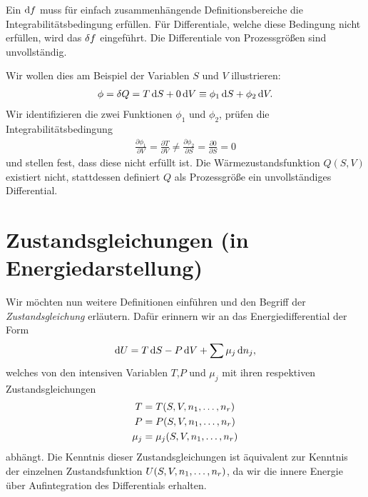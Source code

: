\begin{formal}
    Ein  $\mathop{}\!\mathrm{d} f$ muss für einfach zusammenhängende Definitionsbereiche die Integrabilitätsbedingung erfüllen. Für Differentiale, welche diese Bedingung nicht erfüllen, wird das  $\mathop{}\!\delta f$ eingeführt. Die Differentiale von Prozessgrößen sind unvollständig. 
\end{formal}

Wir wollen dies am Beispiel der Variablen $S$ und $V$ illustrieren:
\begin{align*}
    \phi = \mathop{}\!\delta Q = T\mathop{}\!\mathrm{d} S+0 \mathop{}\!\mathrm{d} V\equiv \phi_1\mathop{}\!\mathrm{d} S+\phi_2 \mathop{}\!\mathrm{d} V.
\end{align*}
Wir identifizieren die zwei Funktionen $\phi_1$ und $\phi_2$, prüfen die Integrabilitätsbedingung
\begin{align*}
    \frac{\partial \phi_1}{\partial V} = \frac{\partial T}{\partial V}\neq \frac{\partial \phi_2}{\partial S}=\frac{\partial0}{\partial S}=0
\end{align*}
und stellen fest, dass diese nicht erfüllt ist. Die Wärmezustandsfunktion $Q(S,V)$ existiert nicht, stattdessen definiert $Q$ als Prozessgröße ein unvollständiges Differential.

\section{Zustandsgleichungen (in Energiedarstellung)}
Wir möchten nun weitere Definitionen einführen und den Begriff der \emph{Zustandsgleichung} erläutern. Dafür erinnern wir an das Energiedifferential der Form
\begin{align*}
    \mathop{}\!\mathrm{d} U = T\mathop{}\!\mathrm{d} S -P\mathop{}\!\mathrm{d} V + \sum\mu_j\mathop{}\!\mathrm{d} n_j,
\end{align*}
welches von den intensiven Variablen $T$,$P$ und $\mu_j$ mit ihren respektiven Zustandsgleichungen
\begin{align*}
    T     & =T(S,V,n_1,\ldots,n_r)     \\
    P     & =P(S,V,n_1,\ldots,n_r)     \\
    \mu_j & =\mu_j(S,V,n_1,\ldots,n_r)
\end{align*}
abhängt. Die Kenntnis dieser Zustandsgleichungen ist äquivalent zur Kenntnis der einzelnen Zustandsfunktion $U(S,V,n_1,\ldots,n_r)$, da wir die innere Energie über Aufintegration des Differentials erhalten.

